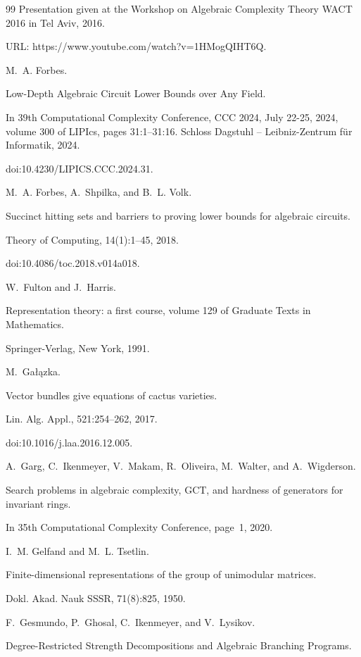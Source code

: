 \begin{thebibliography}{99}
Presentation given at the Workshop on Algebraic Complexity Theory
WACT 2016 in Tel Aviv, 2016.


URL: https://www.youtube.com/watch?v=1HMogQIHT6Q.

M. A. Forbes.


Low-Depth Algebraic Circuit Lower Bounds over Any Field.


In 39th Computational Complexity Conference, CCC 2024, July
22-25, 2024, volume 300 of LIPIcs, pages 31:1–31:16. Schloss
Dagstuhl – Leibniz-Zentrum für Informatik, 2024.


doi:10.4230/LIPICS.CCC.2024.31.

M. A. Forbes, A. Shpilka, and B. L. Volk.


Succinct hitting sets and barriers to proving lower bounds for
algebraic circuits.


Theory of Computing, 14(1):1–45, 2018.


doi:10.4086/toc.2018.v014a018.

W. Fulton and J. Harris.


Representation theory: a first course, volume 129 of Graduate Texts in Mathematics.


Springer-Verlag, New York, 1991.

M. Gałązka.


Vector bundles give equations of cactus varieties.


Lin. Alg. Appl., 521:254–262, 2017.


doi:10.1016/j.laa.2016.12.005.

A. Garg, C. Ikenmeyer, V. Makam, R. Oliveira, M. Walter, and A. Wigderson.


Search problems in algebraic complexity, GCT, and hardness of
generators for invariant rings.


In 35th Computational Complexity Conference, page 1, 2020.

I. M. Gelfand and M. L. Tsetlin.


Finite-dimensional representations of the group of unimodular
matrices.


Dokl. Akad. Nauk SSSR, 71(8):825, 1950.

F. Gesmundo, P. Ghosal, C. Ikenmeyer, and V. Lysikov.


Degree-Restricted Strength Decompositions and Algebraic Branching
Programs.



\end{thebibliography}
